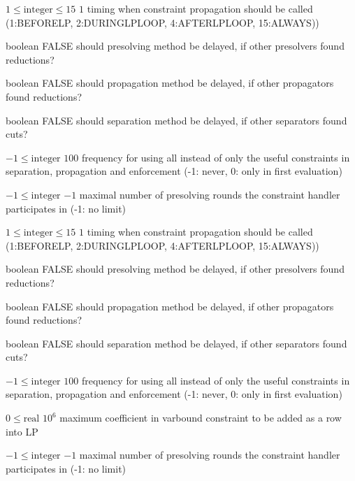 %
{$1\leq\textrm{integer}\leq15$}%
{$1$}%
{timing when constraint propagation should be called (1:BEFORELP, 2:DURINGLPLOOP, 4:AFTERLPLOOP, 15:ALWAYS))}%
{}

%
{boolean}%
{FALSE}%
{should presolving method be delayed, if other presolvers found reductions?}%
{}

%
{boolean}%
{FALSE}%
{should propagation method be delayed, if other propagators found reductions?}%
{}

%
{boolean}%
{FALSE}%
{should separation method be delayed, if other separators found cuts?}%
{}

%
{$-1\leq\textrm{integer}$}%
{$100$}%
{frequency for using all instead of only the useful constraints in separation, propagation and enforcement (-1: never, 0: only in first evaluation)}%
{}

%
{$-1\leq\textrm{integer}$}%
{$-1$}%
{maximal number of presolving rounds the constraint handler participates in (-1: no limit)}%
{}

%
{$1\leq\textrm{integer}\leq15$}%
{$1$}%
{timing when constraint propagation should be called (1:BEFORELP, 2:DURINGLPLOOP, 4:AFTERLPLOOP, 15:ALWAYS))}%
{}

%
{boolean}%
{FALSE}%
{should presolving method be delayed, if other presolvers found reductions?}%
{}

%
{boolean}%
{FALSE}%
{should propagation method be delayed, if other propagators found reductions?}%
{}

%
{boolean}%
{FALSE}%
{should separation method be delayed, if other separators found cuts?}%
{}

%
{$-1\leq\textrm{integer}$}%
{$100$}%
{frequency for using all instead of only the useful constraints in separation, propagation and enforcement (-1: never, 0: only in first evaluation)}%
{}

%
{$0\leq\textrm{real}$}%
{$10^{  6}$}%
{maximum coefficient in varbound constraint to be added as a row into LP}%
{}

%
{$-1\leq\textrm{integer}$}%
{$-1$}%
{maximal number of presolving rounds the constraint handler participates in (-1: no limit)}%
{}


